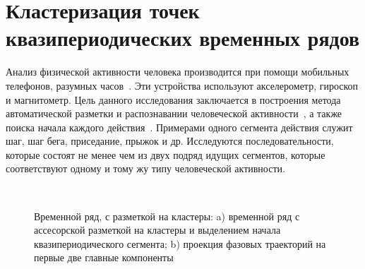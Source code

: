\section{Кластеризация точек квазипериодических временных рядов}

Анализ физической активности человека производится при помощи мобильных телефонов, разумных часов~\cite{kwapisz2010, wang2014}. 
Эти устройства используют акселерометр, гироскоп и магнитометр. 
Цель данного исследования заключается в построения метода автоматической разметки и распознавании человеческой активности~\cite{Ignatov2015, Olivares2012, cinar2018}, а также поиска начала каждого действия~\cite{motrenko2015}. 
Примерами одного сегмента действия служит шаг, шаг бега, приседание, прыжок и др. 
Исследуются последовательности, которые состоят не менее чем из двух подряд идущих сегментов, которые соответствуют одному и тому жу типу человеческой активности.

\begin{figure}[h!t]\center
{}
\\
\caption{Временной ряд, с разметкой на кластеры: a) временной ряд с ассесорской разметкой на кластеры и выделением начала квазипериодического сегмента; b) проекция фазовых траекторий на первые две главные компоненты}
\end{figure}

